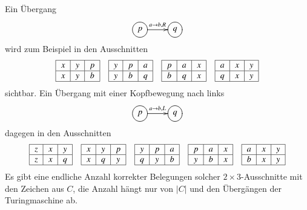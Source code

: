 Ein Übergang
\[
\entrymodifiers={++[o][F]}
\xymatrix{
p\ar[r]^{a\to b,R}
	&q
}
\]
wird zum Beispiel in den Ausschnitten
\[
\begin{tabular}{|c|c|c|}
\hline
$x$&$y$&$p$\\
\hline
$x$&$y$&$b$\\
\hline
\end{tabular}
\quad
\begin{tabular}{|c|c|c|}
\hline
$y$&$p$&$a$\\
\hline
$y$&$b$&$q$\\
\hline
\end{tabular}
\quad
\begin{tabular}{|c|c|c|}
\hline
$p$&$a$&$x$\\
\hline
$b$&$q$&$x$\\
\hline
\end{tabular}
\quad
\begin{tabular}{|c|c|c|}
\hline
$a$&$x$&$y$\\
\hline
$q$&$x$&$y$\\
\hline
\end{tabular}
\]
sichtbar.
Ein Übergang mit einer Kopfbewegung nach links
\[
\entrymodifiers={++[o][F]}
\xymatrix{
p\ar[r]^{a\to b,L}
	&q
}
\]
dagegen in den Ausschnitten
\[
\begin{tabular}{|c|c|c|}
\hline
$z$&$x$&$y$\\
\hline
$z$&$x$&$q$\\
\hline
\end{tabular}
\quad
\begin{tabular}{|c|c|c|}
\hline
$x$&$y$&$p$\\
\hline
$x$&$q$&$y$\\
\hline
\end{tabular}
\quad
\begin{tabular}{|c|c|c|}
\hline
$y$&$p$&$a$\\
\hline
$q$&$y$&$b$\\
\hline
\end{tabular}
\quad
\begin{tabular}{|c|c|c|}
\hline
$p$&$a$&$x$\\
\hline
$y$&$b$&$x$\\
\hline
\end{tabular}
\quad
\begin{tabular}{|c|c|c|}
\hline
$a$&$x$&$y$\\
\hline
$b$&$x$&$y$\\
\hline
\end{tabular}
\]
Es gibt eine endliche Anzahl korrekter Belegungen solcher
$2\times 3$-Ausschnitte mit den Zeichen aus $C$, die Anzahl
hängt nur von $|C|$ und den Übergängen der Turingmaschine ab.


